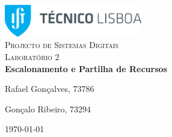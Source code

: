 \begin{titlepage}

	\begin{center}

		\includegraphics[width=6cm]{./title}\\[3cm]

		\textsc{\LARGE Projecto de Sistemas Digitais}\\[1.5cm]

		\textsc{\Large Laboratório 2}\\[1.5cm]


		{ \huge \bfseries Escalonamento e Partilha de Recursos \\[3cm] }


		\noindent
		\begin{minipage}{0.4\textwidth}
			\begin{flushleft} \large
				Rafael Gonçalves, 73786
			\end{flushleft}
		\end{minipage}
		\begin{minipage}{0.4\textwidth}
			\begin{flushright} \large
				Gonçalo Ribeiro, 73294
			\end{flushright}
		\end{minipage}

		\vfill

		{\large \today}


	\end{center}

\end{titlepage}
